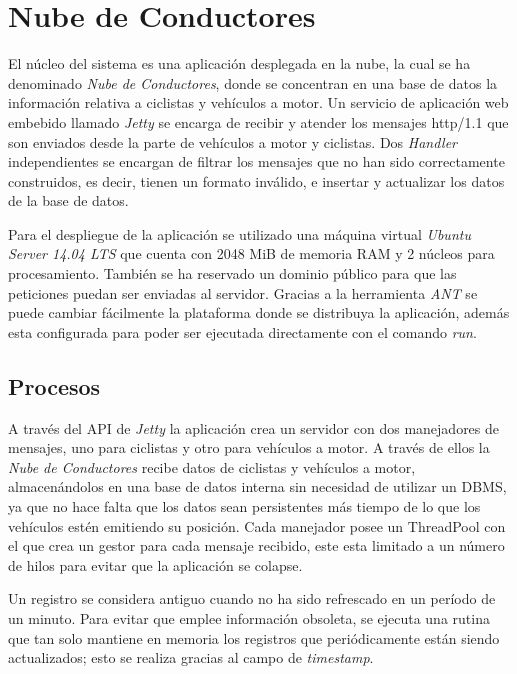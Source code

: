 \section{Nube de Conductores}\label{section:NubeConductores}
El núcleo del sistema es una aplicación desplegada en la nube, la cual se ha denominado \emph{Nube de Conductores}, donde se concentran en una base de datos la información relativa a ciclistas y vehículos a motor. Un servicio de aplicación web embebido llamado \emph{Jetty} se encarga de recibir y atender los mensajes \Gls{http/1.1} que son enviados desde la parte de vehículos a motor y ciclistas. Dos \emph{Handler} independientes se encargan de filtrar los mensajes que no han sido correctamente construidos, es decir, tienen un formato inválido, e insertar y actualizar los datos de la base de datos.

Para el despliegue de la aplicación se utilizado una máquina virtual \emph{Ubuntu Server 14.04 LTS} que cuenta con 2048 MiB de memoria RAM y 2 n\'ucleos para procesamiento. También se ha reservado un dominio público para que las peticiones puedan ser enviadas al servidor. Gracias a la herramienta \emph{ANT} se puede cambiar fácilmente la plataforma donde se distribuya la aplicación, además esta configurada para poder ser ejecutada directamente con el comando \emph{run}.


\subsection{Procesos}\label{ssection:procesos}
A través del API de \emph{Jetty} la aplicación crea un servidor con dos manejadores de mensajes, uno para ciclistas y otro para vehículos a motor. A través de ellos la \emph{Nube de Conductores} recibe datos de ciclistas y vehículos a motor, almacenándolos en una base de datos interna sin necesidad de utilizar un DBMS, ya que no hace falta que los datos sean persistentes más tiempo de lo que los vehículos estén emitiendo su posición. Cada manejador posee un ThreadPool con el que crea un gestor para cada mensaje recibido, este esta limitado a un número de hilos para evitar que la aplicación se colapse. 

Un registro se considera antiguo cuando no ha sido refrescado en un período de un minuto. Para evitar que emplee información obsoleta, se ejecuta una rutina que tan solo mantiene en memoria los registros que periódicamente están siendo actualizados; esto se realiza gracias al campo de \emph{timestamp}.

